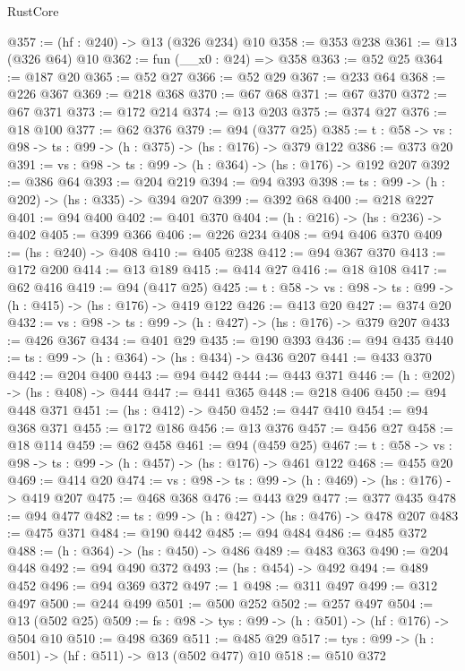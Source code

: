 \begin{lexlean}{RustCore}
\begin{coremodule}
@357 := (hf : @240) -> @13 (@326 @234) @10
@358 := @353 @238
@361 := @13 (@326 @64) @10
@362 := fun (__x0 : @24) => @358
@363 := @52 @25
@364 := @187 @20
@365 := @52 @27
@366 := @52 @29
@367 := @233 @64
@368 := @226 @367
@369 := @218 @368
@370 := @67 @68
@371 := @67 @370
@372 := @67 @371
@373 := @172 @214
@374 := @13 @203
@375 := @374 @27
@376 := @18 @100
@377 := @62 @376
@379 := @94 (@377 @25)
@385 := {t : @58} -> {vs : @98} -> {ts : @99} -> (h : @375) -> (hs : @176) -> @379 @122
@386 := @373 @20
@391 := {vs : @98} -> {ts : @99} -> (h : @364) -> (hs : @176) -> @192 @207
@392 := @386 @64
@393 := @204 @219
@394 := @94 @393
@398 := {ts : @99} -> (h : @202) -> (hs : @335) -> @394 @207
@399 := @392 @68
@400 := @218 @227
@401 := @94 @400
@402 := @401 @370
@404 := (h : @216) -> (hs : @236) -> @402
@405 := @399 @366
@406 := @226 @234
@408 := @94 @406 @370
@409 := (hs : @240) -> @408
@410 := @405 @238
@412 := @94 @367 @370
@413 := @172 @200
@414 := @13 @189
@415 := @414 @27
@416 := @18 @108
@417 := @62 @416
@419 := @94 (@417 @25)
@425 := {t : @58} -> {vs : @98} -> {ts : @99} -> (h : @415) -> (hs : @176) -> @419 @122
@426 := @413 @20
@427 := @374 @20
@432 := {vs : @98} -> {ts : @99} -> (h : @427) -> (hs : @176) -> @379 @207
@433 := @426 @367
@434 := @401 @29
@435 := @190 @393
@436 := @94 @435
@440 := {ts : @99} -> (h : @364) -> (hs : @434) -> @436 @207
@441 := @433 @370
@442 := @204 @400
@443 := @94 @442
@444 := @443 @371
@446 := (h : @202) -> (hs : @408) -> @444
@447 := @441 @365
@448 := @218 @406
@450 := @94 @448 @371
@451 := (hs : @412) -> @450
@452 := @447 @410
@454 := @94 @368 @371
@455 := @172 @186
@456 := @13 @376
@457 := @456 @27
@458 := @18 @114
@459 := @62 @458
@461 := @94 (@459 @25)
@467 := {t : @58} -> {vs : @98} -> {ts : @99} -> (h : @457) -> (hs : @176) -> @461 @122
@468 := @455 @20
@469 := @414 @20
@474 := {vs : @98} -> {ts : @99} -> (h : @469) -> (hs : @176) -> @419 @207
@475 := @468 @368
@476 := @443 @29
@477 := @377 @435
@478 := @94 @477
@482 := {ts : @99} -> (h : @427) -> (hs : @476) -> @478 @207
@483 := @475 @371
@484 := @190 @442
@485 := @94 @484
@486 := @485 @372
@488 := (h : @364) -> (hs : @450) -> @486
@489 := @483 @363
@490 := @204 @448
@492 := @94 @490 @372
@493 := (hs : @454) -> @492
@494 := @489 @452
@496 := @94 @369 @372
@497 := 1
@498 := @311 @497
@499 := @312 @497
@500 := @244 @499
@501 := @500 @252
@502 := @257 @497
@504 := @13 (@502 @25)
@509 := {fs : @98} -> {tys : @99} -> (h : @501) -> (hf : @176) -> @504 @10
@510 := @498 @369
@511 := @485 @29
@517 := {tys : @99} -> (h : @501) -> (hf : @511) -> @13 (@502 @477) @10
@518 := @510 @372

\end{coremodule}
\end{lexlean}
